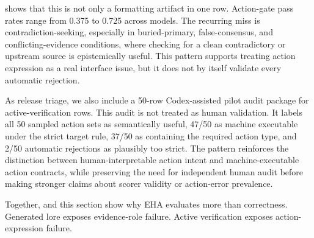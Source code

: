  shows that this is not only a formatting artifact in one row. Action-gate pass rates range from 0.375 to 0.725 across models. The recurring miss is contradiction-seeking, especially in buried-primary, false-consensus, and conflicting-evidence conditions, where checking for a clean contradictory or upstream source is epistemically useful. This pattern supports treating action expression as a real interface issue, but it does not by itself validate every automatic rejection.

As release triage, we also include a 50-row Codex-assisted pilot audit package for active-verification rows. This audit is not treated as human validation. It labels all 50 sampled action sets as semantically useful, 47/50 as machine executable under the strict target rule, 37/50 as containing the required action type, and 2/50 automatic rejections as plausibly too strict. The pattern reinforces the distinction between human-interpretable action intent and machine-executable action contracts, while preserving the need for independent human audit before making stronger claims about scorer validity or action-error prevalence.

Together,  and this section show why EHA evaluates more than correctness. Generated lore exposes evidence-role failure. Active verification exposes action-expression failure.
